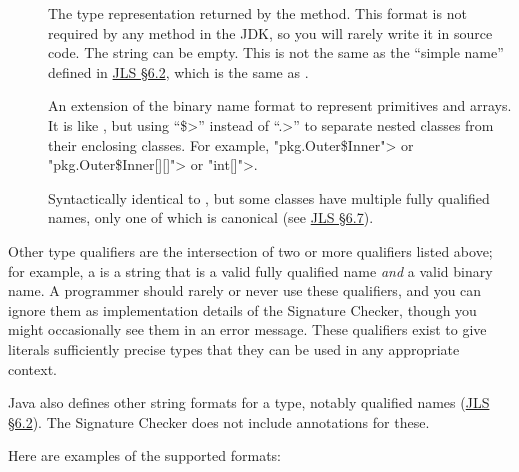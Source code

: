 \begin{description}
\item[]
  The type representation returned by the
  method.  This format is not required by any method in the JDK, so you
  will rarely write it in source code.  The string can be empty.  This
  is not the same as the ``simple name'' defined in
  \href{https://docs.oracle.com/javase/specs/jls/se25/html/jls-6.html#jls-6.2}{JLS
    \S 6.2}, which is the same as
  .

\item[]
  An extension of the binary name format to represent primitives and arrays.
  It is like , but using
  ``\<\$>'' instead of ``\<.>'' to separate nested classes from their
  enclosing classes.  For example, \<"pkg.Outer\$Inner"> or
  \<"pkg.Outer\$Inner[][]"> or \<"int[]">.

\item[]
  Syntactically identical to
  , but some
  classes have multiple fully qualified names, only one of which is
  canonical (see
  \href{https://docs.oracle.com/javase/specs/jls/se25/html/jls-6.html#jls-6.7}{JLS
    \S 6.7}).

\end{description}

Other type qualifiers are the intersection of two or more qualifiers listed
above; for example, a
 is a string
that is a valid fully qualified name \emph{and} a valid binary name.  A
programmer should rarely or never use these qualifiers, and you can ignore
them as implementation details of the Signature Checker, though you might
occasionally see them in an error message.  These qualifiers exist to give
literals sufficiently precise types that they can be used in any
appropriate context.

Java also defines other string formats for a type, notably qualified names
(\href{https://docs.oracle.com/javase/specs/jls/se25/html/jls-6.html#jls-6.2}{JLS
  \S 6.2}). The Signature Checker does not include annotations for these.

\label{signature-annotations-table}

Here are examples of the supported formats:
\label{signature-annotations-examples}


